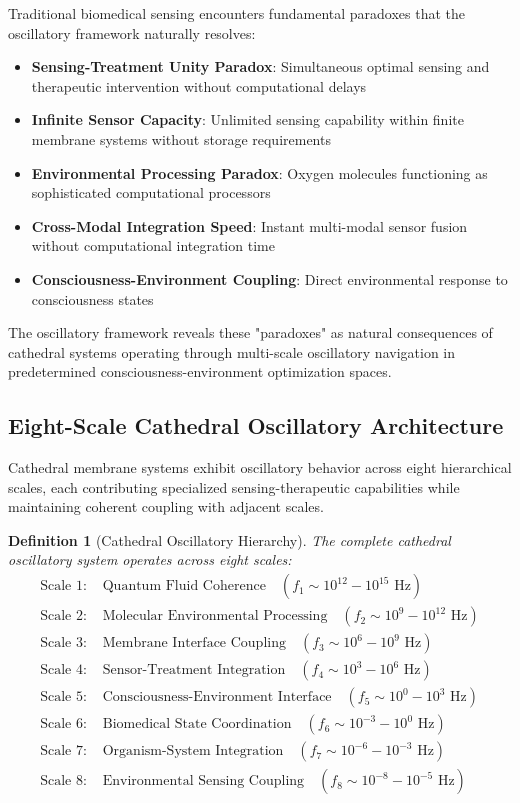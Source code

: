 \documentclass[12pt,a4paper]{article}
\newtheorem{definition}{Definition}
\begin{document}
Traditional biomedical sensing encounters fundamental paradoxes that the oscillatory framework naturally resolves:

\begin{itemize}
\item \textbf{Sensing-Treatment Unity Paradox}: Simultaneous optimal sensing and therapeutic intervention without computational delays
\item \textbf{Infinite Sensor Capacity}: Unlimited sensing capability within finite membrane systems without storage requirements
\item \textbf{Environmental Processing Paradox}: Oxygen molecules functioning as sophisticated computational processors
\item \textbf{Cross-Modal Integration Speed}: Instant multi-modal sensor fusion without computational integration time
\item \textbf{Consciousness-Environment Coupling}: Direct environmental response to consciousness states
\end{itemize}

The oscillatory framework reveals these "paradoxes" as natural consequences of cathedral systems operating through multi-scale oscillatory navigation in predetermined consciousness-environment optimization spaces.

\subsection{Eight-Scale Cathedral Oscillatory Architecture}

Cathedral membrane systems exhibit oscillatory behavior across eight hierarchical scales, each contributing specialized sensing-therapeutic capabilities while maintaining coherent coupling with adjacent scales.

\begin{definition}[Cathedral Oscillatory Hierarchy]
The complete cathedral oscillatory system operates across eight scales:
\begin{align}
\text{Scale 1: } &\text{Quantum Fluid Coherence} \quad (f_1 \sim 10^{12}-10^{15} \text{ Hz}) \\
\text{Scale 2: } &\text{Molecular Environmental Processing} \quad (f_2 \sim 10^9-10^{12} \text{ Hz}) \\
\text{Scale 3: } &\text{Membrane Interface Coupling} \quad (f_3 \sim 10^6-10^9 \text{ Hz}) \\
\text{Scale 4: } &\text{Sensor-Treatment Integration} \quad (f_4 \sim 10^3-10^6 \text{ Hz}) \\
\text{Scale 5: } &\text{Consciousness-Environment Interface} \quad (f_5 \sim 10^0-10^3 \text{ Hz}) \\
\text{Scale 6: } &\text{Biomedical State Coordination} \quad (f_6 \sim 10^{-3}-10^0 \text{ Hz}) \\
\text{Scale 7: } &\text{Organism-System Integration} \quad (f_7 \sim 10^{-6}-10^{-3} \text{ Hz}) \\
\text{Scale 8: } &\text{Environmental Sensing Coupling} \quad (f_8 \sim 10^{-8}-10^{-5} \text{ Hz})
\end{align}
\end{definition}
\end{document}
